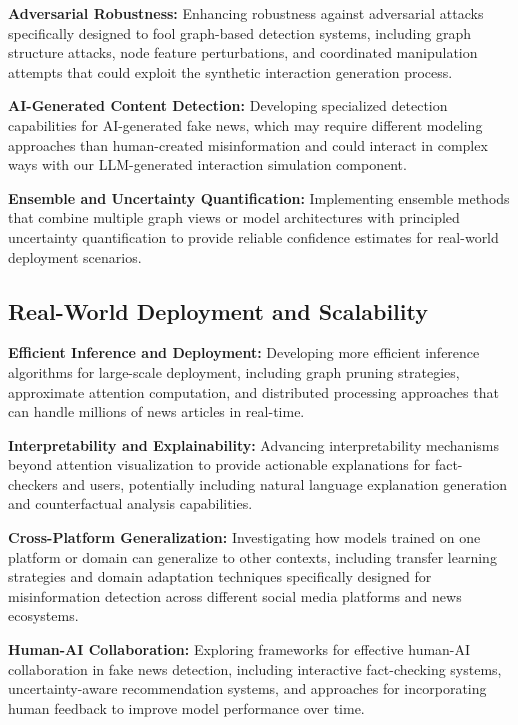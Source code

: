\textbf{Adversarial Robustness:} Enhancing robustness against adversarial attacks specifically designed to fool graph-based detection systems, including graph structure attacks, node feature perturbations, and coordinated manipulation attempts that could exploit the synthetic interaction generation process.

\textbf{AI-Generated Content Detection:} Developing specialized detection capabilities for AI-generated fake news, which may require different modeling approaches than human-created misinformation and could interact in complex ways with our LLM-generated interaction simulation component.

\textbf{Ensemble and Uncertainty Quantification:} Implementing ensemble methods that combine multiple graph views or model architectures with principled uncertainty quantification to provide reliable confidence estimates for real-world deployment scenarios.

\subsection{Real-World Deployment and Scalability}

\textbf{Efficient Inference and Deployment:} Developing more efficient inference algorithms for large-scale deployment, including graph pruning strategies, approximate attention computation, and distributed processing approaches that can handle millions of news articles in real-time.

\textbf{Interpretability and Explainability:} Advancing interpretability mechanisms beyond attention visualization to provide actionable explanations for fact-checkers and users, potentially including natural language explanation generation and counterfactual analysis capabilities.


\textbf{Cross-Platform Generalization:} Investigating how models trained on one platform or domain can generalize to other contexts, including transfer learning strategies and domain adaptation techniques specifically designed for misinformation detection across different social media platforms and news ecosystems.

\textbf{Human-AI Collaboration:} Exploring frameworks for effective human-AI collaboration in fake news detection, including interactive fact-checking systems, uncertainty-aware recommendation systems, and approaches for incorporating human feedback to improve model performance over time.

